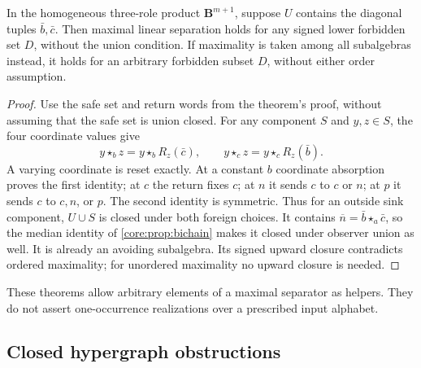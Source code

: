 \begin{corollary}
\label{core:thm:bichain-maximal-linear-separation}
In the homogeneous three-role product $\mathbf B^{m+1}$, suppose $U$
contains the diagonal tuples $\bar b,\bar c$. Then maximal linear
separation holds for any signed lower forbidden set $D$, without the
union condition. If maximality is taken among all subalgebras instead,
it holds for an arbitrary forbidden subset $D$, without either order
assumption.
\end{corollary}
\begin{proof}
Use the safe set and return words from the theorem's proof, without
assuming that the safe set is union closed. For any component $S$ and
$y,z\in S$, the four coordinate values give
\[
 y\star_b z=y\star_b R_z(\bar c),\qquad
 y\star_c z=y\star_c R_z(\bar b).
\]
A varying coordinate is reset exactly. At a constant $b$ coordinate
absorption proves the first identity; at $c$ the return fixes $c$;
at $n$ it sends $c$ to $c$ or $n$; at $p$ it sends $c$ to $c,n$, or $p$.
The second identity is symmetric. Thus for an outside sink component,
$U\cup S$ is closed under both foreign choices. It contains
$\overline n=\bar b\star_a\bar c$, so the median identity of
\cref{core:prop:bichain} makes it closed under observer union as well.
It is already an avoiding subalgebra. Its signed upward closure contradicts
ordered maximality; for unordered maximality no upward closure is needed.
\end{proof}

These theorems allow arbitrary elements of a maximal separator as helpers.
They do not assert one-occurrence realizations over a prescribed input
alphabet.

\subsection{Closed hypergraph obstructions}
\label{app:core-hypergraphs}

